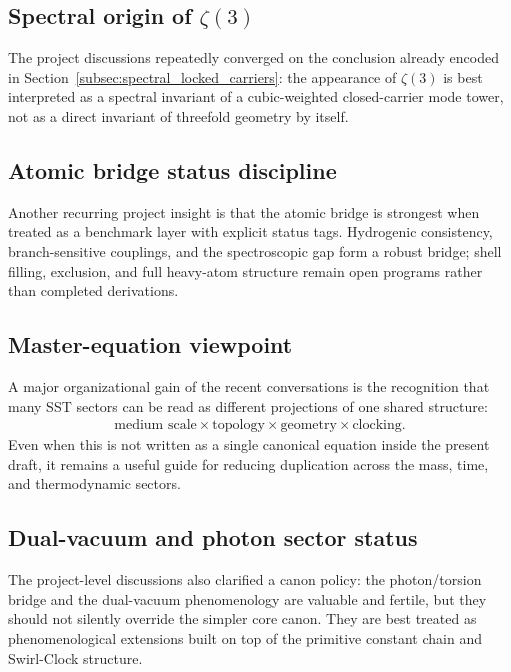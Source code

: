 \documentclass[11pt]{article}
\theoremstyle{definition}
\theoremstyle{plain}
\theoremstyle{remark}
\begin{document}
        \subsection{Spectral origin of \texorpdfstring{$\zeta(3)$}{zeta(3)}}
            The project discussions repeatedly converged on the conclusion already encoded in Section~\ref{subsec:spectral_locked_carriers}: the appearance of $\zeta(3)$ is best interpreted as a spectral invariant of a cubic-weighted closed-carrier mode tower, not as a direct invariant of threefold geometry by itself.

        \subsection{Atomic bridge status discipline}
            Another recurring project insight is that the atomic bridge is strongest when treated as a benchmark layer with explicit status tags. Hydrogenic consistency, branch-sensitive couplings, and the spectroscopic gap form a robust bridge; shell filling, exclusion, and full heavy-atom structure remain open programs rather than completed derivations.

        \subsection{Master-equation viewpoint}
            A major organizational gain of the recent conversations is the recognition that many SST sectors can be read as different projections of one shared structure:
            \begin{align}
                \text{medium scale} \times \text{topology} \times \text{geometry} \times \text{clocking}.
            \end{align}
            Even when this is not written as a single canonical equation inside the present draft, it remains a useful guide for reducing duplication across the mass, time, and thermodynamic sectors.

        \subsection{Dual-vacuum and photon sector status}
            The project-level discussions also clarified a canon policy: the photon/torsion bridge and the dual-vacuum phenomenology are valuable and fertile, but they should not silently override the simpler core canon. They are best treated as phenomenological extensions built on top of the primitive constant chain and Swirl-Clock structure.
\end{document}

